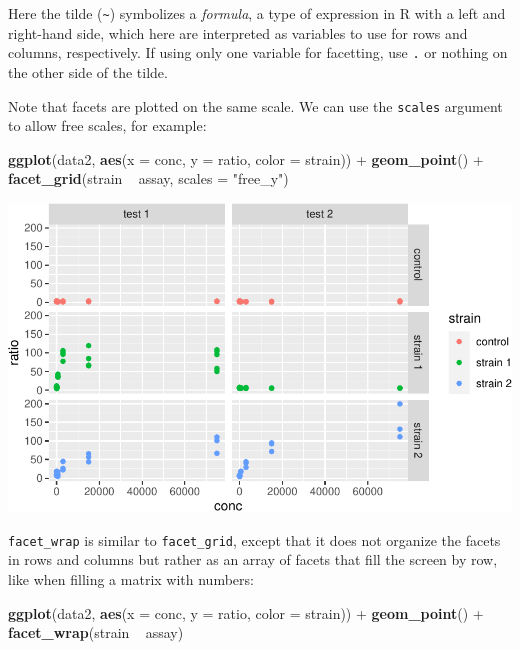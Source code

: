 \documentclass[]{book}
\newenvironment{Shaded}{}{}
\newcommand{\DataTypeTok}[1]{\textcolor[rgb]{0.56,0.13,0.00}{#1}}
\newcommand{\KeywordTok}[1]{\textcolor[rgb]{0.00,0.44,0.13}{\textbf{#1}}}
\newcommand{\NormalTok}[1]{#1}
\newcommand{\OperatorTok}[1]{\textcolor[rgb]{0.40,0.40,0.40}{#1}}
\newcommand{\StringTok}[1]{\textcolor[rgb]{0.25,0.44,0.63}{#1}}
\begin{document}
Here the tilde (\texttt{\textasciitilde{}}) symbolizes a \emph{formula}, a type of expression in R with a left and right-hand side, which here are interpreted as variables to use for rows and columns, respectively. If using only one variable for facetting, use \texttt{.} or nothing on the other side of the tilde.

Note that facets are plotted on the same scale. We can use the \texttt{scales} argument to allow free scales, for example:

\begin{Shaded}
\begin{Highlighting}[]
\KeywordTok{ggplot}\NormalTok{(data2, }\KeywordTok{aes}\NormalTok{(}\DataTypeTok{x =}\NormalTok{ conc, }\DataTypeTok{y =}\NormalTok{ ratio, }\DataTypeTok{color =}\NormalTok{ strain)) }\OperatorTok{+}
\StringTok{  }\KeywordTok{geom_point}\NormalTok{() }\OperatorTok{+}
\StringTok{  }\KeywordTok{facet_grid}\NormalTok{(strain }\OperatorTok{~}\StringTok{ }\NormalTok{assay, }\DataTypeTok{scales =} \StringTok{"free_y"}\NormalTok{)}
\end{Highlighting}
\end{Shaded}

\begin{center}\includegraphics[width=\textwidth]{TRES-Tidy-Tutorial_files/figure-latex/unnamed-chunk-131-1} \end{center}

\texttt{facet\_wrap} is similar to \texttt{facet\_grid}, except that it does not organize the facets in rows and columns but rather as an array of facets that fill the screen by row, like when filling a matrix with numbers:

\begin{Shaded}
\begin{Highlighting}[]
\KeywordTok{ggplot}\NormalTok{(data2, }\KeywordTok{aes}\NormalTok{(}\DataTypeTok{x =}\NormalTok{ conc, }\DataTypeTok{y =}\NormalTok{ ratio, }\DataTypeTok{color =}\NormalTok{ strain)) }\OperatorTok{+}
\StringTok{  }\KeywordTok{geom_point}\NormalTok{() }\OperatorTok{+}
\StringTok{  }\KeywordTok{facet_wrap}\NormalTok{(strain }\OperatorTok{~}\StringTok{ }\NormalTok{assay)}
\end{Highlighting}
\end{Shaded}
\end{document}
